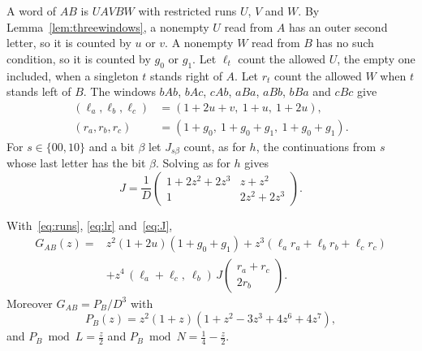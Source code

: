 A word of $AB$ is $UAVBW$ with restricted runs $U$, $V$ and $W$. By
Lemma~\ref{lem:threewindows}, a nonempty $U$ read from $A$ has an outer second letter, so it is
counted by $u$ or $v$. A nonempty $W$ read from $B$ has no such condition, so it is counted by
$g_0$ or $g_1$. Let $\ell_t$ count the allowed $U$, the empty one included, when a singleton $t$
stands right of $A$. Let $r_t$ count the allowed $W$ when $t$ stands left of $B$. The windows
$bAb$, $bAc$, $cAb$, $aBa$, $aBb$, $bBa$ and $cBc$ give
\begin{equation}\label{eq:lr}
\begin{aligned}
(\ell_a,\ell_b,\ell_c)&=(1+2u+v,\ 1+u,\ 1+2u),\\
(r_a,r_b,r_c)&=(1+g_0,\ 1+g_0+g_1,\ 1+g_0+g_1).
\end{aligned}
\end{equation}
For $s\in\{00,10\}$ and a bit $\beta$ let $J_{s\beta}$ count, as for $h$, the continuations
from $s$ whose last letter has the bit $\beta$. Solving as for $h$ gives
\begin{equation}\label{eq:J}
J=\frac1D\begin{pmatrix}1+2z^2+2z^3&z+z^2\\1&2z^2+2z^3\end{pmatrix}.
\end{equation}

\begin{proposition}\label{prop:GAB}
With~\eqref{eq:runs}, \eqref{eq:lr} and~\eqref{eq:J},
\begin{equation}\label{eq:GAB}
\begin{aligned}
G_{AB}(z)={}&z^2(1+2u)(1+g_0+g_1)+z^3(\ell_ar_a+\ell_br_b+\ell_cr_c)\\
&+z^4\,(\ell_a+\ell_c,\ \ell_b)\,J\begin{pmatrix}r_a+r_c\\2r_b\end{pmatrix}.
\end{aligned}
\end{equation}
Moreover $G_{AB}=P_B/D^3$ with
\begin{equation}\label{eq:PB}
P_B(z)=z^2(1+z)(1+z^2-3z^3+4z^6+4z^7),
\end{equation}
and $P_B\bmod L=\tfrac z2$ and $P_B\bmod N=\tfrac14-\tfrac z2$.
\end{proposition}

